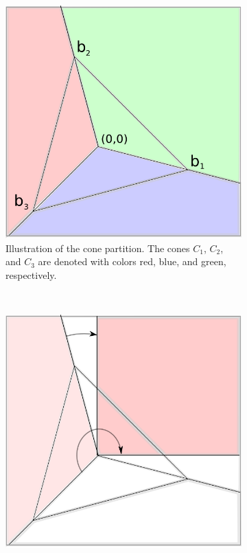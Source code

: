 \documentclass[11pt,twoside]{article}
\theoremstyle{definition}
\theoremstyle{definition}
\begin{document}
\begin{figure}
        \centering
        \begin{subfigure}[b]{0.45\textwidth}
                \includegraphics[width=\textwidth]{conesA.png}
\caption{Illustration of the cone partition. The cones $C_1$, $C_2$, and $C_3$ are denoted with colors red, blue, and green, respectively. }	
\label{coneA}
        \end{subfigure}%
        ~ %
        \begin{subfigure}[b]{0.45\textwidth}
                \includegraphics[width=\textwidth]{conesB.png}

\end{subfigure}
\end{figure}
\end{document}

